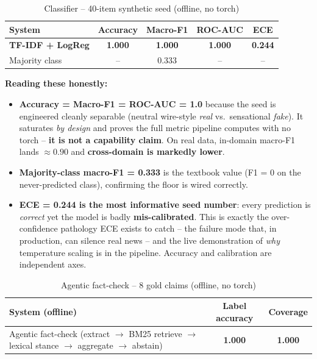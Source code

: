 \documentclass[12pt,a4paper]{article}
\begin{document}
\begin{table}[H]
\centering
\caption{Classifier -- 40-item synthetic seed (offline, no torch)}
\begin{tabular}{lcccc}
\toprule
\textbf{System} & \textbf{Accuracy} & \textbf{Macro-F1} & \textbf{ROC-AUC} & \textbf{ECE} \\
\midrule
\textbf{TF-IDF + LogReg} & \textbf{1.000} & \textbf{1.000} & \textbf{1.000} & \textbf{0.244} \\
Majority class & -- & 0.333 & -- & -- \\
\bottomrule
\end{tabular}
\end{table}

\noindent \textbf{Reading these honestly:}
\begin{itemize}\setlength\itemsep{0.15em}
  \item \textbf{Accuracy = Macro-F1 = ROC-AUC = 1.0} because the seed is engineered cleanly separable (neutral wire-style \emph{real} vs.\ sensational \emph{fake}). It saturates \emph{by design} and proves the full metric pipeline computes with no torch -- \textbf{it is not a capability claim}. On real data, in-domain macro-F1 lands $\approx 0.90$ and \textbf{cross-domain is markedly lower}.
  \item \textbf{Majority-class macro-F1 = 0.333} is the textbook value (F1 = 0 on the never-predicted class), confirming the floor is wired correctly.
  \item \textbf{ECE = 0.244 is the most informative seed number}: every prediction is \emph{correct} yet the model is badly \textbf{mis-calibrated}. This is exactly the over-confidence pathology ECE exists to catch -- the failure mode that, in production, can silence real news -- and the live demonstration of \emph{why} temperature scaling is in the pipeline. Accuracy and calibration are independent axes.
\end{itemize}

\begin{table}[H]
\centering
\caption{Agentic fact-check -- 8 gold claims (offline, no torch)}
\begin{tabular}{lcc}
\toprule
\textbf{System (offline)} & \textbf{Label accuracy} & \textbf{Coverage} \\
\midrule
Agentic fact-check (extract $\rightarrow$ BM25 retrieve $\rightarrow$ lexical stance $\rightarrow$ aggregate $\rightarrow$ abstain) & \textbf{1.000} & \textbf{1.000} \\
\bottomrule
\end{tabular}
\end{table}
\end{document}
